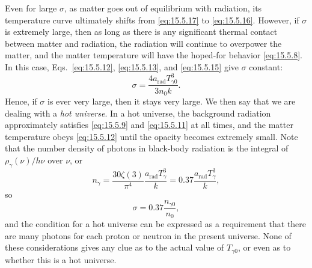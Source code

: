 Even for large \(\sigma\), as matter goes out of equilibrium with radiation,
its temperature curve ultimately shifts from \eqref{eq:15.5.17} to
\eqref{eq:15.5.16}. However, if \(\sigma\) is extremely large, then as long
as there is any significant thermal contact between matter and radiation, the
radiation will continue to overpower the matter, and the matter temperature
will have the hoped-for behavior \eqref{eq:15.5.8}. In this case,
Eqs.~\eqref{eq:15.5.12}, \eqref{eq:15.5.13}, and \eqref{eq:15.5.15} give
\(\sigma\) constant:
\begin{equation}
  \sigma=\frac{4a_{\mathrm{rad}}T_{\gamma0}^3}{3n_0k}.
  \tag{15.5.18}\label{eq:15.5.18}
\end{equation}
Hence, if \(\sigma\) is ever very large, then it stays very large. We then say
that we are dealing with a \emph{hot universe}. In a hot universe, the
background radiation approximately satisfies \eqref{eq:15.5.9} and
\eqref{eq:15.5.11} at all times, and the matter temperature obeys
\eqref{eq:15.5.12} until the opacity becomes extremely small. Note that the
number density of photons in black-body radiation is the integral of
\(\rho_\gamma(\nu)/h\nu\) over \(\nu\), or
\[
  n_\gamma
  =
  \frac{30\zeta(3)}{\pi^4}\frac{a_{\mathrm{rad}}T_\gamma^3}{k}
  =
  0.37\frac{a_{\mathrm{rad}}T_\gamma^3}{k},
\]
so
\[
  \sigma=0.37\frac{n_{\gamma0}}{n_0},
\]
and the condition for a hot universe can be expressed as a requirement that
there are many photons for each proton or neutron in the present universe.
None of these considerations gives any clue as to the actual value of
\(T_{\gamma0}\), or even as to whether this is a hot universe.

